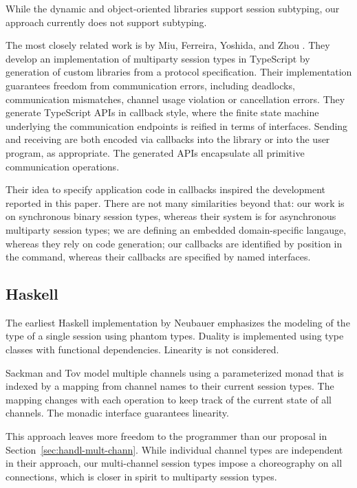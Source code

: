 \documentclass[acmsmall,review,anonymous,screen]{acmart}
\begin{document}
While the dynamic and object-oriented libraries support session
subtyping, our approach currently does not support subtyping. 


The most closely related work is by Miu, Ferreira, Yoshida, and Zhou
\cite{DBLP:conf/cc/Miu0Y021}. They develop an
implementation of multiparty session types in TypeScript by generation
of custom libraries from a protocol specification. Their
implementation guarantees freedom from
communication errors, including deadlocks, communication
mismatches, channel usage violation or cancellation errors. They
generate TypeScript APIs in callback style, where the finite state
machine underlying the communication endpoints is reified in terms of
interfaces. Sending and receiving are both encoded via callbacks 
into the library or into the user program, as appropriate. The
generated APIs encapsulate all primitive communication operations.

Their idea to specify application code in callbacks inspired the
development reported in this paper. There are not many similarities
beyond that: our work is on synchronous binary session types, whereas
their system is for asynchronous multiparty session types; we are
defining an embedded domain-specific langauge, whereas they rely on
code generation; our callbacks are identified by position in the
command, whereas their callbacks are specified by named interfaces.

\subsection{Haskell}
\label{sec:hask-impl}

The earliest Haskell implementation by Neubauer \cite{DBLP:conf/padl/NeubauerT04}
emphasizes the modeling of the type of a single session using phantom
types. Duality is implemented using type classes with functional
dependencies. Linearity is not considered.

Sackman \cite{SackmanE08} and Tov \cite{DBLP:conf/popl/TovP11} model
multiple channels using a parameterized monad that is indexed by a mapping
from channel names to their current session types. The mapping changes
with each operation to keep track of the current state of all
channels. The monadic interface guarantees linearity.

This approach leaves more freedom to the programmer than our proposal
in Section~\ref{sec:handl-mult-chann}. While individual channel types
are independent in their approach, our multi-channel session types
impose a choreography on all connections, which is closer in spirit to
multiparty session types. 
\end{document}
